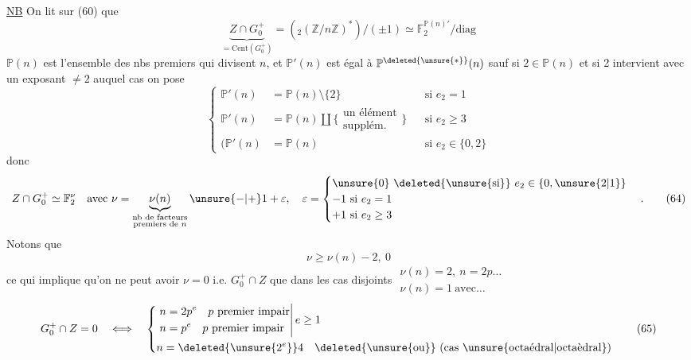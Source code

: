\uline{NB} On lit sur (60) que
\[
\underbrace{Z\cap G_0^+}_{=\mathrm{Cent}(G_0^+)}=
({}_2(\mathbb Z/n\mathbb Z)^*)/(\pm1)\simeq\mathbb F_2^{\mathbb P(n)'}/\mathrm{diag}
\tag*{(62)}
\]
$\mathbb P(n)$ est l'ensemble des nbs premiers  qui divisent $n$, et $\mathbb P'(n)$ est égal à $\mathbb P^{\deleted{\unsure{*}}}(n)$ sauf si $2\in\mathbb P(n)$ et si 2 intervient avec un  exposant  $\ne2$  auquel cas on pose
\[
\left\{\begin{aligned}
\mathbb P'(n)&=\mathbb P(n)\setminus\{2\}&&\text{si }e_2=1\\
\mathbb P'(n)&=\mathbb P(n)\amalg\{\substack{\text{un élément}\\\text{supplém.}}\}&&\text{si }e_2\ge3\\
(\mathbb P'(n)&=\mathbb P(n)&&\text{si }e_2\in\{0,2\}
\end{aligned}\right.\tag*{(63)}
\]
donc
\[
Z\cap G_0^+\simeq\mathbb F_2^\nu\quad\text{avec }\nu=
\underbrace{\nu(n)}_{\substack{\text{nb de facteurs}\\\text{premiers de }n}}
\unsure{-|+}1+\varepsilon,\quad\varepsilon=
\begin{cases}
\unsure{0}\ \deleted{\unsure{\text{si}}}\ e_2\in\{0,\unsure{2|1}\}\\
-1\ \text{si }e_2=1\\
+1\ \text{si }e_2\ge3
\end{cases}.
\tag*{(64)}
\]
Notons que
\[
\nu\ge\nu(n)-2,\ 0
\]
ce qui implique qu'on ne peut avoir $\nu=0$ i.e. $G_0^+\cap Z$ que dans les cas disjoints \(\substack{\nu(n)=2,\ n=2p\ldots\\\nu(n)=1\ \text{avec}\ldots}\)
\[
G_0^+\cap Z=0\quad\Longleftrightarrow\quad
\left\{\begin{aligned}
&\left.\begin{aligned}
 n&=2p^e\quad p\text{ premier impair}\\
 n&=p^e\quad p\text{ premier impair}
 \end{aligned}\right|e\ge1\\
&n=\deleted{\unsure{2^e}}4\quad\deleted{\text{\unsure{ou}}}\ (\text{cas \unsure{octaédral|octaèdral}})
\end{aligned}\right.
\tag*{(65)}
\]


